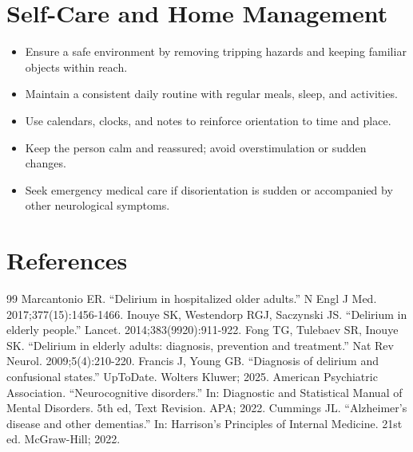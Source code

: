 \section*{Self-Care and Home Management}
\begin{itemize}
  \item Ensure a safe environment by removing tripping hazards and keeping familiar objects within reach.
  \item Maintain a consistent daily routine with regular meals, sleep, and activities.
  \item Use calendars, clocks, and notes to reinforce orientation to time and place.
  \item Keep the person calm and reassured; avoid overstimulation or sudden changes.
  \item Seek emergency medical care if disorientation is sudden or accompanied by other neurological symptoms.
\end{itemize}

\section*{References}
\begin{thebibliography}{99}
 Marcantonio ER. ``Delirium in hospitalized older adults.'' N Engl J Med. 2017;377(15):1456-1466.
 Inouye SK, Westendorp RGJ, Saczynski JS. ``Delirium in elderly people.'' Lancet. 2014;383(9920):911-922.
 Fong TG, Tulebaev SR, Inouye SK. ``Delirium in elderly adults: diagnosis, prevention and treatment.'' Nat Rev Neurol. 2009;5(4):210-220.
 Francis J, Young GB. ``Diagnosis of delirium and confusional states.'' UpToDate. Wolters Kluwer; 2025.
 American Psychiatric Association. ``Neurocognitive disorders.'' In: Diagnostic and Statistical Manual of Mental Disorders. 5th ed, Text Revision. APA; 2022.
 Cummings JL. ``Alzheimer's disease and other dementias.'' In: Harrison's Principles of Internal Medicine. 21st ed. McGraw-Hill; 2022.
\end{thebibliography}
